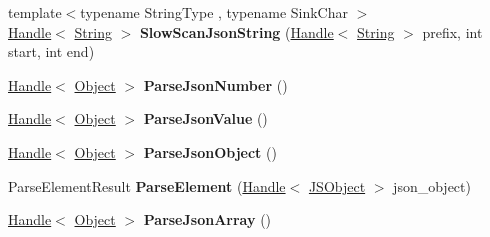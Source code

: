 \begin{DoxyCompactItemize}
\item 
{\footnotesize template$<$typename String\+Type , typename Sink\+Char $>$ }\\\hyperlink{classv8_1_1internal_1_1_handle}{Handle}$<$ \hyperlink{classv8_1_1internal_1_1_string}{String} $>$ {\bfseries Slow\+Scan\+Json\+String} (\hyperlink{classv8_1_1internal_1_1_handle}{Handle}$<$ \hyperlink{classv8_1_1internal_1_1_string}{String} $>$ prefix, int start, int end)\hypertarget{classv8_1_1internal_1_1_b_a_s_e___e_m_b_e_d_d_e_d_af86842f7a9cccb83250b9ceb6c6f8c61}{}\label{classv8_1_1internal_1_1_b_a_s_e___e_m_b_e_d_d_e_d_af86842f7a9cccb83250b9ceb6c6f8c61}

\item 
\hyperlink{classv8_1_1internal_1_1_handle}{Handle}$<$ \hyperlink{classv8_1_1internal_1_1_object}{Object} $>$ {\bfseries Parse\+Json\+Number} ()\hypertarget{classv8_1_1internal_1_1_b_a_s_e___e_m_b_e_d_d_e_d_afaddbff10feaaa3fa4bed5b961ed9678}{}\label{classv8_1_1internal_1_1_b_a_s_e___e_m_b_e_d_d_e_d_afaddbff10feaaa3fa4bed5b961ed9678}

\item 
\hyperlink{classv8_1_1internal_1_1_handle}{Handle}$<$ \hyperlink{classv8_1_1internal_1_1_object}{Object} $>$ {\bfseries Parse\+Json\+Value} ()\hypertarget{classv8_1_1internal_1_1_b_a_s_e___e_m_b_e_d_d_e_d_ab40535a9f6a939843926e93575ea82cf}{}\label{classv8_1_1internal_1_1_b_a_s_e___e_m_b_e_d_d_e_d_ab40535a9f6a939843926e93575ea82cf}

\item 
\hyperlink{classv8_1_1internal_1_1_handle}{Handle}$<$ \hyperlink{classv8_1_1internal_1_1_object}{Object} $>$ {\bfseries Parse\+Json\+Object} ()\hypertarget{classv8_1_1internal_1_1_b_a_s_e___e_m_b_e_d_d_e_d_aa7b057b0bbbc57754e9225744e6b9adb}{}\label{classv8_1_1internal_1_1_b_a_s_e___e_m_b_e_d_d_e_d_aa7b057b0bbbc57754e9225744e6b9adb}

\item 
Parse\+Element\+Result {\bfseries Parse\+Element} (\hyperlink{classv8_1_1internal_1_1_handle}{Handle}$<$ \hyperlink{classv8_1_1internal_1_1_j_s_object}{J\+S\+Object} $>$ json\+\_\+object)\hypertarget{classv8_1_1internal_1_1_b_a_s_e___e_m_b_e_d_d_e_d_af2ae6e771dd50cc5cb9257f23a5dbf09}{}\label{classv8_1_1internal_1_1_b_a_s_e___e_m_b_e_d_d_e_d_af2ae6e771dd50cc5cb9257f23a5dbf09}

\item 
\hyperlink{classv8_1_1internal_1_1_handle}{Handle}$<$ \hyperlink{classv8_1_1internal_1_1_object}{Object} $>$ {\bfseries Parse\+Json\+Array} ()\hypertarget{classv8_1_1internal_1_1_b_a_s_e___e_m_b_e_d_d_e_d_a1a3529cbba15ba65da369e2fd8f39389}{}\label{classv8_1_1internal_1_1_b_a_s_e___e_m_b_e_d_d_e_d_a1a3529cbba15ba65da369e2fd8f39389}


\end{DoxyCompactItemize}

